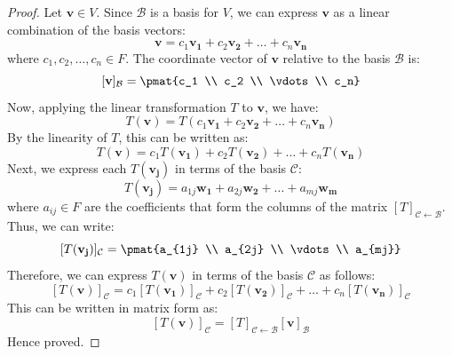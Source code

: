 \documentclass[openany]{book}
\begin{document}
\begin{proof}
    Let $\mathbf{v} \in V$. Since $\mathcal{B}$ is a basis for $V$, we can express $\mathbf{v}$ as a linear combination of the basis vectors:
    $$\mathbf{v} = c_1 \mathbf{v_1} + c_2 \mathbf{v_2} + \ldots + c_n \mathbf{v_n}$$
    where $c_1, c_2, \ldots, c_n \in F$. The coordinate vector of $\mathbf{v}$ relative to the basis $\mathcal{B}$ is:
    $$[\mathbf{v}]_{\mathcal{B}} = \pmat{c_1 \\ c_2 \\ \vdots \\ c_n}$$
    Now, applying the linear transformation $T$ to $\mathbf{v}$, we have:
    $$T(\mathbf{v}) = T(c_1 \mathbf{v_1} + c_2 \mathbf{v_2} + \ldots + c_n \mathbf{v_n})$$
    By the linearity of $T$, this can be written as:
    $$T(\mathbf{v}) = c_1 T(\mathbf{v_1}) + c_2 T(\mathbf{v_2}) + \ldots + c_n T(\mathbf{v_n})$$
    Next, we express each $T(\mathbf{v_j})$ in terms of the basis $\mathcal{C}$:
    $$T(\mathbf{v_j}) = a_{1j} \mathbf{w_1} + a_{2j} \mathbf{w_2} + \ldots + a_{mj} \mathbf{w_m}$$
    where $a_{ij} \in F$ are the coefficients that form the columns of the matrix $[T]_{\mathcal{C} \leftarrow \mathcal{B}}$. Thus, we can write:
    $$[T(\mathbf{v_j})]_{\mathcal{C}} = \pmat{a_{1j} \\ a_{2j} \\ \vdots \\ a_{mj}}$$
    Therefore, we can express $T(\mathbf{v})$ in terms of the basis $\mathcal{C}$ as follows:
    $$[T(\mathbf{v})]_{\mathcal{C}} = c_1 [T(\mathbf{v_1})]_{\mathcal{C}} + c_2 [T(\mathbf{v_2})]_{\mathcal{C}} + \ldots + c_n [T(\mathbf{v_n})]_{\mathcal{C}}$$
    This can be written in matrix form as:
    $$[T(\mathbf{v})]_{\mathcal{C}} = [T]_{\mathcal{C} \leftarrow \mathcal{B}} [\mathbf{v}]_{\mathcal{B}}$$
    Hence proved.
\end{proof}
\end{document}
